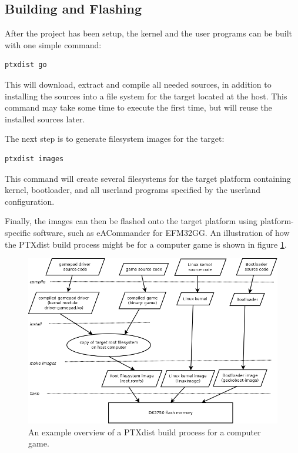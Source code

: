 \subsection{Building and Flashing}
After the project has been setup, the kernel and the user programs can be built with one simple command:
\lstset{style=lststyle-terminal}
\begin{lstlisting}
ptxdist go
\end{lstlisting}
This will download, extract and compile all needed sources, in addition to installing the sources into a file system for the target located at the host. This command may take some time to execute the first time, but will reuse the installed sources later.

The next step is to generate filesystem images for the target:
\lstset{style=lststyle-terminal}
\begin{lstlisting}
ptxdist images
\end{lstlisting}
This command will create several filesystems for the target platform containing kernel, bootloader, and all userland programs specified by the userland configuration. 

Finally, the images can then be flashed onto the target platform using platform-specific software, such as eACommander for EFM32GG. An illustration of how the PTXdist build process might be for a computer game is shown in figure \ref{fig:ptxdist-build-process}.
\begin{figure}[ht]\label{fig:ptxdist-build-process}
  \includegraphics[width=\textwidth]{images/ptxdist_build_process.png}
  \caption{An example overview of a PTXdist build process for a computer game.}
\end{figure}


